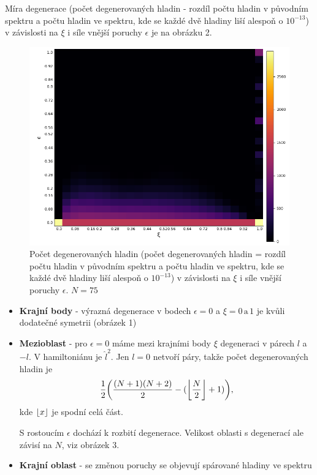 \documentclass{article}
\DeclarePairedDelimiter\floor{\lfloor}{\rfloor}
\begin{document}
Míra degenerace (počet degenerovaných hladin - rozdíl počtu hladin v původním spektru a počtu hladin ve spektru, kde se každé dvě hladiny liší alespoň
o $10^{-13}$) v závislosti na $\xi$ i síle vnější poruchy $\epsilon$ je na obrázku 2.

\begin{figure}[H]
    \centering
    \includegraphics[width=.75\linewidth]{Deg.png}
    \caption{Počet degenerovaných hladin  (počet degenerovaných hladin = rozdíl počtu hladin v původním spektru a počtu hladin ve spektru, kde se každé dvě hladiny liší alespoň
    o $10^{-13}$) v závislosti na $\xi$ i síle vnější poruchy $\epsilon$. $N = 75$}
  \end{figure}

\begin{itemize}
    \item \textbf{Krajní body} - výrazná degenerace v bodech $\epsilon = 0$ a $\xi = 0\,\text{a}\,1$ je kvůli dodatečné symetrii (obrázek 1)
    \item \textbf{Mezioblast} - pro $\epsilon = 0$ máme mezi krajními body $\xi$ degeneraci v párech $l$ a $-l$. V hamiltoniánu je $\hat{l}^2$.
    Jen $l = 0$ netvoří páry, takže počet degenerovaných hladin je 
    $$ \frac{1}{2}\bigg( \frac{(N+1)(N+2)}{2} - (\floor*{\frac{N}{2}} + 1) \bigg), $$
kde $\floor*{x}$ je spodní celá část.

S rostoucím $\epsilon$ dochází k rozbití degenerace. Velikost oblasti s degenerací ale závisí na $N$, viz obrázek 3.

    \item \textbf{Krajní oblast} - se změnou poruchy se objevují spárované hladiny ve spektru
\end{itemize}
\end{document}
